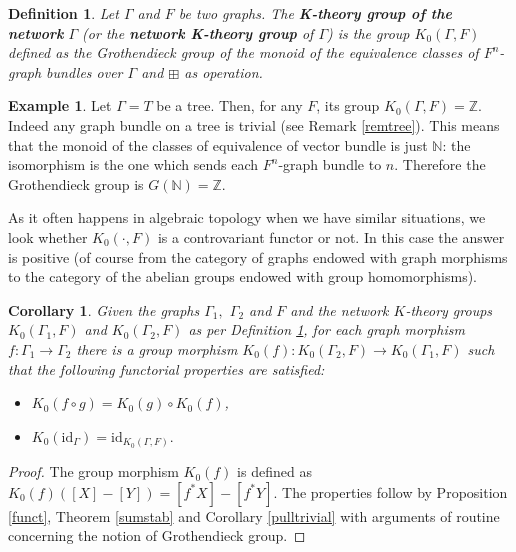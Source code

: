 \documentclass{amsart}
\newtheorem{cor}[theo]{Corollary}
\newtheorem{defn}[theo]{Definition}
\theoremstyle{definition}
\newtheorem{example}[theo]{Example}
\numberwithin{equation}{section}
\begin{document}
\begin{defn}\label{nktg}
Let $\Gamma$ and $F$ be two graphs. The \textbf{K-theory group of the network} $\Gamma$ (or the \textbf{network K-theory group} of $\Gamma$)  is the group $K_0(\Gamma, F)$ defined as the Grothendieck group of the monoid of the equivalence classes of $F^n$-graph bundles over $\Gamma$ and $\boxplus$ as operation.
\end{defn}

\begin{example}
    Let $\Gamma = T$ be a tree. Then, for any $F$, its group $K_0(\Gamma, F) = \mathbb{Z}$. Indeed any graph bundle on a tree is trivial (see Remark \ref{remtree}). This means that the monoid of the classes of equivalence of vector bundle is just $\mathbb{N}$: the isomorphism is the one which sends each $F^n$-graph bundle to $n$. Therefore the Grothendieck group is $G(\mathbb{N}) = \mathbb{Z}$.
\end{example}

As it often happens in algebraic topology when we have similar situations, we look whether $K_0(\cdot, F)$ is a controvariant functor or not. In this case the answer is positive (of course from the category of graphs endowed with graph morphisms to the category of the abelian groups endowed with group homomorphisms). 

\begin{cor}\label{k.t.func}
Given the graphs $\Gamma_1,$ $ \Gamma_2$  and $F$ and the network $K$-theory groups $K_0(\Gamma_1, F)$ and $ K_0(\Gamma_2, F)$ as per Definition \ref{nktg}, for each graph morphism $f: \Gamma_1 \longrightarrow \Gamma_2$ there is a group morphism $K_0(f): K_0(\Gamma_2, F) \longrightarrow K_0(\Gamma_1, F)$ such that the following functorial properties are satisfied:
\begin{itemize}
    \item[{\rm (1).}] $K_0(f \circ g) = K_0(g) \circ K_0(f)$,
    \item[{\rm (2).}] $K_0(\mathrm{id}_\Gamma) = \mathrm{id}_{K_0(\Gamma, F)}.$
\end{itemize}
\end{cor}
\begin{proof}
The group morphism $K_0(f)$ is defined as $K_0(f)([X]-[Y]) = [f^*X] - [f^*Y]$.
The properties follow by  Proposition \ref{funct}, Theorem \ref{sumstab} and Corollary \ref{pulltrivial} with arguments of routine concerning the notion of Grothendieck group. %
\end{proof}
\end{document}
